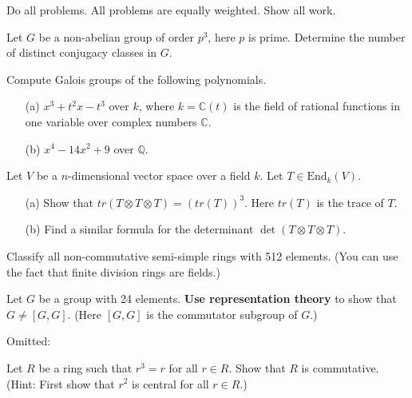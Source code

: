 \documentclass[openany]{book}
\begin{document}
Do all problems. All problems are equally weighted. Show all work.


\begin{prob}
    Let \(G\) be a non-abelian group of order \(p^3\), here \(p\) is prime. Determine the number of distinct conjugacy classes in \(G\).
\end{prob}





\begin{prob}
    Compute Galois groups of the following polynomials.
    \begin{itemize}
        \item[(a)] \(x^3 + t^2x - t^3\) over \(k\), where \(k = \mathbb{C}(t)\) is the field of rational functions in one variable over complex numbers \(\mathbb{C}\).
        \item[(b)] \(x^4 - 14x^2 + 9\) over \(\mathbb{Q}\).
    \end{itemize}
\end{prob}



\begin{prob}
    Let \(V\) be a \(n\)-dimensional vector space over a field \(k\). Let \(T \in \text{End}_k(V)\).
    \begin{itemize}
        \item[(a)] Show that \(tr(T \otimes T \otimes T) = (tr(T))^3\). Here \(tr(T)\) is the trace of \(T\).
        \item[(b)] Find a similar formula for the determinant \(\det(T \otimes T \otimes T)\).
    \end{itemize}
\end{prob}



\begin{prob}
    Classify all non-commutative semi-simple rings with 512 elements. (You can use the fact that finite division rings are fields.)
\end{prob}


\begin{prob}
    Let \(G\) be a group with 24 elements. \textbf{Use representation theory} to show that \(G \neq [G, G]\). (Here \([G, G]\) is the commutator subgroup of \(G\).)
\end{prob}


Omitted:

\begin{prob}
    Let \(R\) be a ring such that \(r^3 = r\) for all \(r \in R\). Show that \(R\) is commutative. (Hint: First show that \(r^2\) is central for all \(r \in R\).)
\end{prob}
\end{document}
